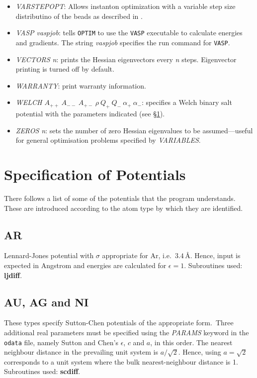 \documentclass[12pt,a4paper,dvips]{article}
\begin{document}
\begin{itemize}
\item {\it VARSTEPOPT\/}: Allows instanton optimization with a variable step size distributino of the beads as described in \cite{Rommel2011b}.

\item {\it VASP vaspjob\/}: tells {\tt OPTIM} to use the {\tt VASP} 
executable to calculate energies and gradients.
The string {\it vaspjob\/} specifies the run command for {\tt VASP}.

\item {\it VECTORS n\/}: prints the Hessian eigenvectors every {\it n\/}
steps. Eigenvector printing is turned off by default.

\item {\it WARRANTY\/}: print warranty information.

\item {\it WELCH $A_{++}\ A_{--}\ A_{+-}\ \rho\ Q_+\ Q_-\ \alpha_+\ \alpha_-$\/}: specifies a Welch binary
salt potential with the parameters indicated (see \S\ref{sec:potentials}).

\item {\it ZEROS n\/}: sets the number of zero Hessian eigenvalues to be
assumed---useful for general optimisation problems specified by {\it VARIABLES\/}. 
\end{itemize}

\section{Specification of Potentials}
\label{sec:potentials}
There follows a list of some of the 
potentials that the program understands. These are introduced according to the atom
type by which they are identified.

\subsection{AR}Lennard-Jones potential with $\sigma$ appropriate for Ar,
i.e.~$3.4\,$\AA. Hence, input is expected in Angstrom and energies are calculated
for $\epsilon=1$. Subroutines used: {\bf ljdiff}.

\subsection{AU, AG and NI}These types specify Sutton-Chen potentials of the appropriate
form.\cite{suttonc90}\ 
Three additional real parameters must be specified using the {\it PARAMS\/} keyword
in the {\tt odata} file,
namely Sutton and Chen's $\epsilon$, $c$ and $a$, in this order.
The nearest neighbour distance in the prevailing unit system is $a/\sqrt{2}$. Hence,
using $a=\sqrt{2}$ corresponds to a unit system where the bulk nearest-neighbour distance is 1.
Subroutines used: {\bf scdiff}.
\end{document}
